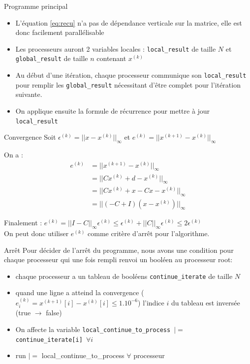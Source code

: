 \documentclass{beamer}
\begin{document}
\begin{frame}{Programme principal}
  \begin{itemize}
    \item L'équation \eqref{eq:recu} n'a pas de dépendance verticale sur la matrice, elle est donc facilement parallélisable
    \item Les processeurs auront 2 variables locales : \texttt{local\_result} de taille \(N\) et \texttt{global\_result} de taille \(n\) contenant $x^{(k)}$
    \item Au début d'une itération, chaque processeur communique son \texttt{local\_result} pour remplir les \texttt{global\_result} nécessitant d'\^etre complet pour l'itération suivante.
    \item On applique ensuite la formule de récurrence pour mettre à jour \texttt{local\_result}
  \end{itemize}
\end{frame}

\begin{frame}{Convergence}
  Soit $\epsilon^{(k)} = ||x - x^{(k)}||_{\infty}$ et $e^{(k)} = ||x^{(k+1)} - x^{(k)}||_{\infty}$

  On a : 
  \begin{align*}
      e^{(k)} &= ||x^{(k+1)} - x^{(k)}||_{\infty}\\
      &= ||Cx^{(k)} + d - x^{(k)}||_{\infty}\\
      &= ||Cx^{(k)} + x - Cx - x^{(k)}||_{\infty}\\
      &= ||(-C + I)(x - x^{(k)})||_{\infty}
  \end{align*}

  Finalement : $e^{(k)} = ||I - C||_{\infty}\epsilon^{(k)} \leq \epsilon^{(k)} + ||C||_{\infty}\epsilon^{(k)} \leq 2\epsilon^{(k)}$\\
  On peut donc utiliser $e^{(k)}$ comme critère d'arr\^et pour l'algorithme.
\end{frame}

\begin{frame}{Arr\^et}
  Pour décider de l'arr\^et du programme, nous avons une condition pour chaque processeur qui une fois rempli renvoi un booléen au processeur root:
  \begin{itemize}
    \item chaque processeur a un tableau de booléens \texttt{continue\_iterate} de taille \(N\)
    \item quand une ligne a atteind la convergence ($e^{(k)}_{i} = x^{(k+1)}[i] - x^{(k)}[i] \leq 1.10^{-6}$) l'indice $i$ du tableau est inversée (true $\rightarrow$ false)
    \item On affecte la variable \texttt{local\_continue\_to\_process $|=$ continue\_iterate[i] $\forall i$}
    \item run $|=$ local\_continue\_to\_process $\forall$ processeur
  \end{itemize}

\end{frame}
\end{document}
